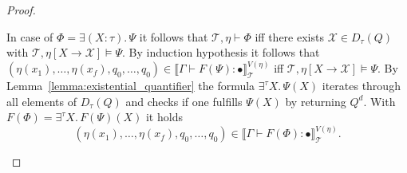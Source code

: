 \begin{proof}
\begin{compactitem}
        \item In case of $\Phi = \exists (X \colon \tau).\,\Psi$ it follows that $\mathcal{T}, \eta \vdash \Phi$ iff
        there exists $\mathcal{X} \in D_\tau(Q)$ with $\mathcal{T}, \eta[X \rightarrow \mathcal {X}] \models \Psi$.
        By induction hypothesis it follows that $(\eta(x_1), \dots, \eta(x_{f}), q_0, \dots, q_0) \in
        \llbracket \Gamma \vdash F(\Psi) \colon \bullet \rrbracket^{V(\eta)}_\mathcal{T}$ iff $\mathcal{T}, \eta[X
        \rightarrow \mathcal {X}] \models \Psi$. By Lemma~\ref{lemma:existential_quantifier} the formula
        $\exists^\tau X.\, \Psi(X)$ iterates through all elements of $D_\tau(Q)$ and checks if one fulfills $\Psi(X)$
        by returning $Q^d$.
        With $F(\Phi) = \exists^\tau X.\, F(\Psi)(X)$ it holds \[(\eta(x_1), \dots, \eta(x_{f}), q_0, \dots, q_0) \in
        \llbracket \Gamma \vdash F(\Phi) \colon \bullet \rrbracket^{V(\eta)}_\mathcal{T}.\]


\end{compactitem}
\end{proof}
